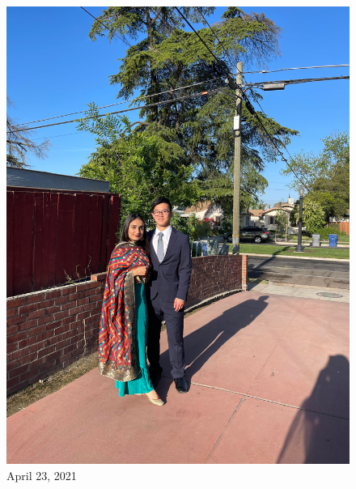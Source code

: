 \documentclass[
]{book}
\begin{document}
\begin{figure}
\centering
\includegraphics[width=5.20833in,height=\textheight]{mimages/8.3 4-23-2021.jpg}
\caption{April 23, 2021}
\end{figure}
\end{document}
